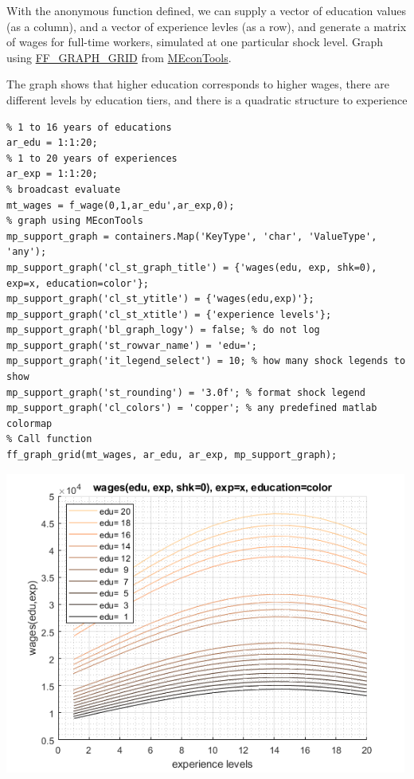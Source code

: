 \documentclass[
]{book}
\begin{document}
With the anonymous function defined, we can supply a vector of education
values (as a column), and a vector of experience levles (as a row), and
generate a matrix of wages for full-time workers, simulated at one
particular shock level. Graph using
\href{https://fanwangecon.github.io/MEconTools/MEconTools/doc/graph/htmlpdfm/fx_graph_grid.html}{FF\_GRAPH\_GRID}
from \href{https://fanwangecon.github.io/MEconTools/}{MEconTools}.

The graph shows that higher education corresponds to higher wages, there
are different levels by education tiers, and there is a quadratic
structure to experience

\begin{verbatim}
% 1 to 16 years of educations
ar_edu = 1:1:20;
% 1 to 20 years of experiences
ar_exp = 1:1:20;
% broadcast evaluate
mt_wages = f_wage(0,1,ar_edu',ar_exp,0);
% graph using MEconTools
mp_support_graph = containers.Map('KeyType', 'char', 'ValueType', 'any');
mp_support_graph('cl_st_graph_title') = {'wages(edu, exp, shk=0), exp=x, education=color'};
mp_support_graph('cl_st_ytitle') = {'wages(edu,exp)'};
mp_support_graph('cl_st_xtitle') = {'experience levels'};
mp_support_graph('bl_graph_logy') = false; % do not log
mp_support_graph('st_rowvar_name') = 'edu=';
mp_support_graph('it_legend_select') = 10; % how many shock legends to show
mp_support_graph('st_rounding') = '3.0f'; % format shock legend
mp_support_graph('cl_colors') = 'copper'; % any predefined matlab colormap
% Call function
ff_graph_grid(mt_wages, ar_edu, ar_exp, mp_support_graph);
\end{verbatim}

\includegraphics[width=5.20833in,height=\textheight]{img/fs_wage_equation_images/figure_0.png}
\end{document}
